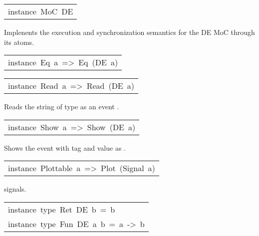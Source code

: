 \begin{haddockdesc}
\item[\begin{tabular}{@{}l}
instance\ MoC\ DE
\end{tabular}]\haddockbegindoc
Implenents the execution and synchronization semantics for the DE
 MoC through its atoms.\par

\end{haddockdesc}
\begin{haddockdesc}
\item[\begin{tabular}{@{}l}
instance\ Eq\ a\ =>\ Eq\ (DE\ a)
\end{tabular}]
\end{haddockdesc}
\begin{haddockdesc}
\item[\begin{tabular}{@{}l}
instance\ Read\ a\ =>\ Read\ (DE\ a)
\end{tabular}]\haddockbegindoc
Reads the string of type  as an event .\par

\end{haddockdesc}
\begin{haddockdesc}
\item[\begin{tabular}{@{}l}
instance\ Show\ a\ =>\ Show\ (DE\ a)
\end{tabular}]\haddockbegindoc
Shows the event with tag  and value  as .\par

\end{haddockdesc}
\begin{haddockdesc}
\item[\begin{tabular}{@{}l}
instance\ Plottable\ a\ =>\ Plot\ (Signal\ a)
\end{tabular}]\haddockbegindoc
{} signals.\par

\end{haddockdesc}
\begin{haddockdesc}
\item[\begin{tabular}{@{}l}
instance\ type\ Ret\ DE\ b\ =\ b\\instance\ type\ Fun\ DE\ a\ b\ =\ a\ ->\ b
\end{tabular}]
\end{haddockdesc}
